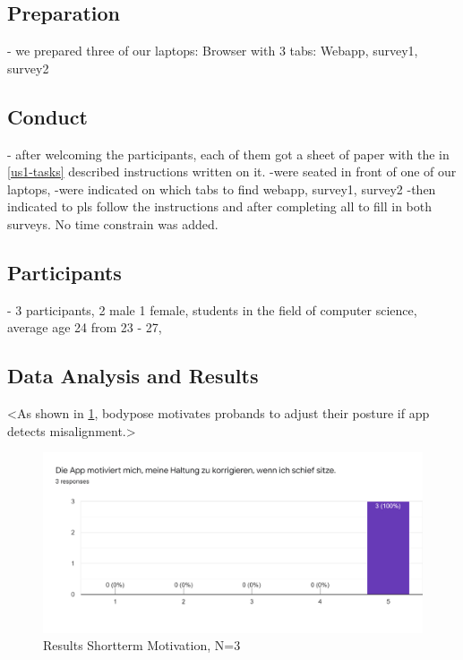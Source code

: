 \subsection{Preparation} %
- we prepared three of our laptops: Browser with 3 tabs: Webapp, survey1, survey2 

\subsection{Conduct} %
- after welcoming the participants, each of them got a sheet of paper with the in \ref{us1-tasks} described instructions written on it. -were seated in front of one of our laptops, -were indicated on which tabs to find webapp, survey1, survey2 -then indicated to pls follow the instructions and after completing all to fill in both surveys. No time constrain was added.  

\subsection{Participants} %
\label{us1-participants}
- 3 participants, 2 male 1 female, students in the field of computer science, average age 24 from 23 - 27,


\subsection{Data Analysis and Results} %
\label{us1-data-analysis-results}
<As shown in \ref{fig:us-gs-shortterm}, bodypose motivates probands to adjust their posture if app detects misalignment.> 

\begin{figure}[hbp]
\centering
\includegraphics[width=\linewidth]{media/us-gs-shortterm-motivation-results.png}    
\caption{Results Shortterm Motivation, N=3}
\label{fig:us-gs-shortterm}
\end{figure}

